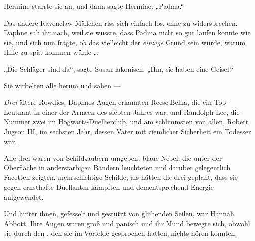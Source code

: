 Hermine starrte sie an, und dann sagte Hermine:
„Padma.“

Das andere Ravenclaw-Mädchen riss sich einfach los, ohne zu widersprechen. Daphne sah ihr nach, weil sie wusste, dass Padma nicht so gut laufen konnte wie sie, und sich nun fragte, ob das vielleicht der \emph{einzige} Grund sein würde, warum Hilfe zu spät kommen würde …

„Die Schläger sind da“, sagte Susan lakonisch.
„Hm, sie haben eine Geisel.“

Sie wirbelten alle herum und sahen —

\emph{Drei} ältere Rowdies, Daphnes Augen erkannten Reese Belka, die ein Top-Leutnant in einer der Armeen des siebten Jahres war, und Randolph Lee, die Nummer zwei im Hogwarts-Duellierclub, und am schlimmsten von allen, Robert Jugson III, im sechsten Jahr, dessen Vater mit ziemlicher Sicherheit ein Todesser war.

Alle drei waren von Schildzaubern umgeben, blaue Nebel, die unter der Oberfläche in andersfarbigen Bändern leuchteten und darüber gelegentlich Facetten zeigten, mehrschichtige Schilde, als hätten die drei geplant, dass sie gegen ernsthafte Duellanten kämpften und dementsprechend Energie aufgewendet.

Und hinter ihnen, gefesselt und gestützt von glühenden Seilen, war Hannah Abbott. Ihre Augen waren groß und panisch und ihr Mund bewegte sich, obwohl sie durch den , den sie im Vorfelde gesprochen hatten, nichts hören konnten.

